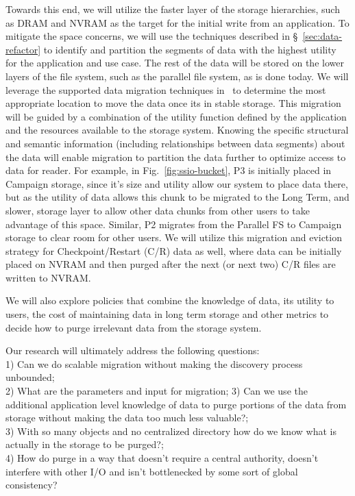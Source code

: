 Towards this end, we will utilize the faster layer of the
storage hierarchies, such as DRAM and NVRAM as the target for
the initial write from an application. To mitigate the space concerns, we
will use the techniques described in \S~\ref{sec:data-refactor} to
identify and partition the segments of data with the highest utility for the
application and use case. The rest of the data will be stored on the
lower layers of the file system, such as the parallel file system, as is done today. 
We will leverage the supported data
migration techniques in \Sir~to determine the most appropriate location to
move the data once its in stable storage. This migration will be guided by a
combination of the utility function defined by the application and the
resources available to the storage system. Knowing the specific structural
and semantic information (including relationships between data segments)
about the data will enable migration to partition the data further to
optimize access to data for reader. For example, in Fig.~\ref{fig:ssio-bucket},
P3 is initially placed in Campaign storage, since it's size and utility allow our system
to place data there, but as the utility of data allows this chunk to be migrated to the 
Long Term, and slower, storage layer to allow other data chunks from other users to take advantage
of this space. Similar, P2 migrates from the Parallel FS to Campaign storage to clear room for other
users. We will utilize this migration and eviction strategy for Checkpoint/Restart (C/R) data as well, 
where data can be initially placed on NVRAM and then purged after the next (or next two) C/R files
are written to NVRAM.

We will also explore policies that combine the knowledge of data, its
utility to users, the cost of maintaining data in long term storage and
other metrics to decide how to purge irrelevant data from the storage
system. 

Our research will ultimately address the following questions:\\
1) Can we do scalable migration without making the discovery process
    unbounded;\\
2) What are the parameters and input for migration;
3)  Can we use the additional application level knowledge of data to purge
    portions of the data from storage without making the data too much less
    valuable?;\\
3)  With so many objects and no centralized directory how do we know what
    is actually in the storage to be purged?;\\
4)  How do purge in a way that doesn't require a central authority,
    doesn't interfere with other I/O and isn't bottlenecked by some sort of
    global consistency?

